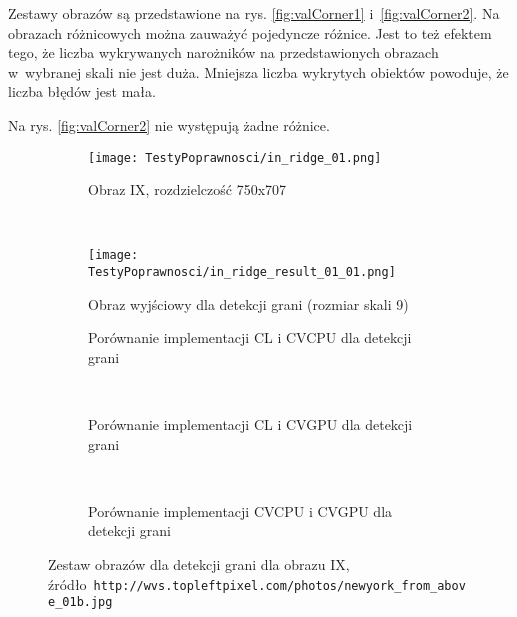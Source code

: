 Zestawy obrazów są przedstawione na rys. \ref{fig:valCorner1} i~\ref{fig:valCorner2}. Na obrazach różnicowych można zauważyć pojedyncze różnice. Jest to też efektem tego, że liczba wykrywanych narożników na przedstawionych obrazach w~wybranej skali nie jest duża. Mniejsza liczba wykrytych obiektów powoduje, że liczba błędów jest mała.

Na rys. \ref{fig:valCorner2} nie występują żadne różnice.

\begin{figure}[h]

\begin{center}
\begin{subfigure}[t]{0.3\textwidth}
\texttt{[image: TestyPoprawnosci/in\_ridge\_01.png]}
\caption{Obraz IX, rozdzielczość 750x707}
\label{fig:valRidge01}
\end{subfigure}
~
\begin{subfigure}[t]{0.3\textwidth}
\texttt{[image: TestyPoprawnosci/in\_ridge\_result\_01\_01.png]}
\caption{Obraz wyjściowy dla detekcji grani (rozmiar skali 9)}
\label{fig:valRidgeResult01}
\end{subfigure}
\end{center}

\begin{subfigure}[t]{0.3\textwidth}
	\centering
	\setlength\fboxsep{0pt}
	\setlength\fboxrule{0.5pt}
	\caption{Porównanie implementacji CL i CVCPU dla detekcji grani}
	\label{fig:valRidge1CLCVCPU}
\end{subfigure}
~
\begin{subfigure}[t]{0.3\textwidth}
	\centering
	\setlength\fboxsep{0pt}
	\setlength\fboxrule{0.5pt}
	\caption{Porównanie implementacji CL i CVGPU dla detekcji grani}
	\label{fig:valRidge1CLCVGPU}
\end{subfigure}
~
\begin{subfigure}[t]{0.3\textwidth}
	\centering
	\setlength\fboxsep{0pt}
	\setlength\fboxrule{0.5pt}
	\caption{Porównanie implementacji CVCPU i CVGPU dla detekcji grani}
	\label{fig:valRidge1CVCPUCVGPU}                 
\end{subfigure}
\caption{Zestaw obrazów dla detekcji grani dla obrazu IX, \tiny{źródło~\texttt{http://wvs.topleftpixel.com/photos/newyork\_from\_above\_01b.jpg}}}

\label{fig:valRidge1}
\end{figure}

